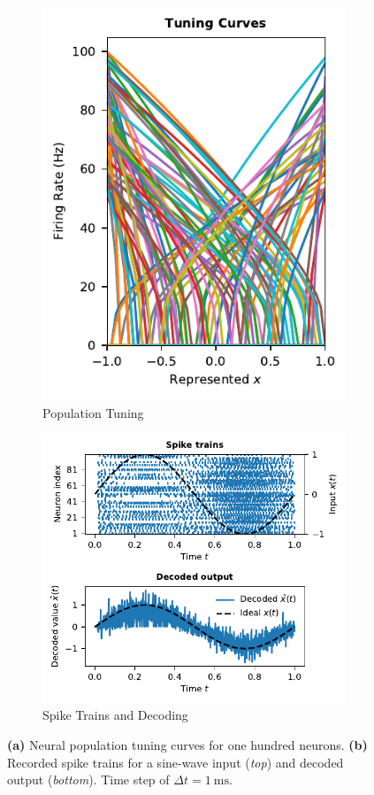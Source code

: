 \documentclass[10pt,letterpaper,oneside]{article}
\begin{document}
\begin{figure}[p]
	\begin{subfigure}[b]{0.4\textwidth}
		\centering
		\includegraphics{media/hundred_neurons_tuning_curves.pdf}
		\caption{Population Tuning}
	\end{subfigure}
	\begin{subfigure}[b]{0.6\textwidth}
		\centering
		\includegraphics{media/hundred_neurons_spike_train.pdf}
		\caption{Spike Trains and Decoding}
	\end{subfigure}
	\caption{\textbf{(a)} Neural population tuning curves for one hundred neurons. \textbf{(b)} Recorded spike trains for a sine-wave input (\emph{top}) and decoded output (\emph{bottom}).  Time step of $\Delta t = \SI{1}{\milli\second}$. }
	\label{fig:hundred_neurons}
\end{figure}
\end{document}
